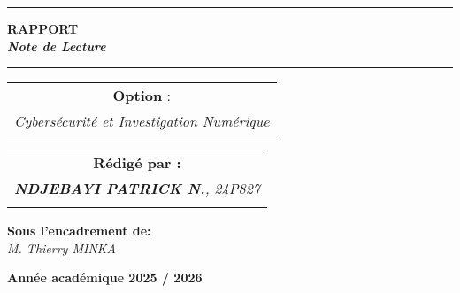 \documentclass[memoire, 12pt]{report}
\begin{document}
\begin{titlepage}
\begin{center}
		\vspace{0.5cm}
		\begin{tabular}{l*{40}{@{\hskip 3.5cm}c@{\hskip5cm}} p{3.5cm} r}
		\end{tabular}
		
		\noindent\rule{\textwidth}{0.7mm}
		\Large{{\textbf{RAPPORT}}}\\
		\Large{{\textbf{\textit{Note de Lecture}}}}
		\noindent\rule{\textwidth}{0.7mm}
	\end{center}
		
	\begin{center}
	\begin{tabular}{c}
		
		\vspace{0.1cm}
		\normalsize
	
	
		\vspace{0.1cm}
		\normalsize\textbf{Option }:\\			
		\textsl{Cybersécurité et Investigation Numérique}
		
	\end{tabular}
	\end{center}
		
	\begin{center}
		\normalsize %
		\begin{tabular}{c}
			\vspace{0.07cm}
			\hspace{0.02cm} \textbf{\textbf{Rédigé par :}}\\
			
			\hspace{0.02cm} \textsl{\textbf{NDJEBAYI PATRICK N.}, 24P827}\\\\
			
			
		\end{tabular}
	\end{center}
	
	\begin{center}
	\hspace{0.02cm} \textbf{Sous l'encadrement de:}\\
	\hspace{0.02cm} \textsl{M. Thierry MINKA}
	\end{center}
	
    
	\vspace{2cm}
	\begin{center}
		\textbf{Année académique 2025 / 2026}
	\end{center}
		
	\vspace{-1.4cm}
	
		
	\vfill%
	
\end{titlepage}
\tableofcontents
\newpage
\end{document}
